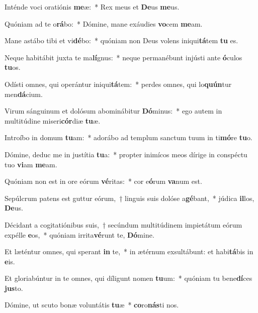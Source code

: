 \item Inténde voci oratiónis \textbf{me}æ:~* Rex meus et \textbf{De}us \textbf{me}us.
\item Quóniam ad te o\textbf{rá}bo:~* Dómine, mane exáudies \textbf{vo}cem \textbf{me}am.
\item Mane astábo tibi et vi\textbf{dé}bo:~* quóniam non Deus volens iniqui\textbf{tá}tem \textbf{tu} es.
\item Neque habitábit juxta te ma\textbf{lí}gnus:~* neque permanébunt injústi ante \textbf{ó}culos \textbf{tu}os.
\item Odísti omnes, qui operántur iniqui\textbf{tá}tem:~* perdes omnes, qui lo\textbf{quún}tur men\textbf{dá}cium.
\item Virum sánguinum et dolósum abominábitur \textbf{Dó}minus:~* ego autem in multitúdine miseri\textbf{cór}diæ \textbf{tu}æ.
\item Introíbo in domum \textbf{tu}am:~* adorábo ad templum sanctum tuum in ti\textbf{mó}re \textbf{tu}o.
\item Dómine, deduc me in justítia \textbf{tu}a:~* propter inimícos meos dírige in conspéctu tuo \textbf{vi}am \textbf{me}am.
\item Quóniam non est in ore eórum \textbf{vé}ritas:~* cor e\textbf{ó}rum \textbf{va}num est.
\item Sepúlcrum patens est guttur eórum,~† linguis suis dolóse a\textbf{gé}bant,~* júdica \textbf{il}los, \textbf{De}us.
\item Décidant a cogitatiónibus suis,~† secúndum multitúdinem impietátum eórum expélle \textbf{e}os,~* quóniam irrita\textbf{vé}runt te, \textbf{Dó}mine.
\item Et læténtur omnes, qui sperant \textbf{in} te,~* in ætérnum exsultábunt: et habi\textbf{tá}bis in \textbf{e}is.
\item Et gloriabúntur in te omnes, qui díligunt nomen \textbf{tu}um:~* quóniam tu bene\textbf{dí}ces \textbf{jus}to.
\item Dómine, ut scuto bonæ voluntátis \textbf{tu}æ~* \textbf{co}ro\textbf{nás}ti nos.
